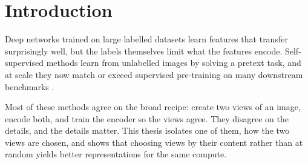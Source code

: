 \chapter{Introduction}
\label{ch:introduction}

Deep networks trained on large labelled datasets learn features that transfer surprisingly well,
but the labels themselves limit what the features encode. Self-supervised methods learn from
unlabelled images by solving a pretext task, and at scale they now match or exceed supervised
pre-training on many downstream benchmarks \citep{chen2020simclr, he2020moco}.

Most of these methods agree on the broad recipe: create two views of an image, encode both, and
train the encoder so the views agree. They disagree on the details, and the details matter.
This thesis isolates one of them, how the two views are chosen, and shows that choosing views
by their content rather than at random yields better representations for the same compute.
